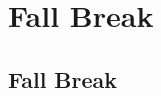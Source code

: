 \clearpage

\renewcommand{\ChapTitle}{Fall Break}
\renewcommand{\SectionTitle}{Fall Break}

\chapter{\ChapTitle}
\section{\SectionTitle}
